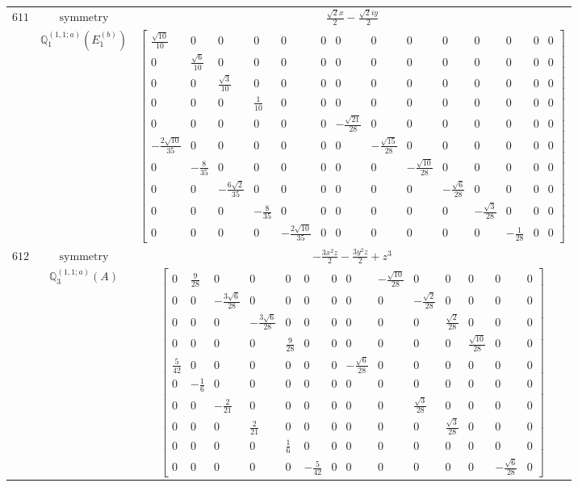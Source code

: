 \documentclass[fleqn,8pt,landscape]{jsarticle}
\begin{document}
\begin{longtable}{ccc}
$ 611 $ & $ \text{symmetry} $ & $ \frac{\sqrt{2} x}{2} - \frac{\sqrt{2} i y}{2} $ \\
$  $ & $ \mathbb{Q}_{1}^{(1,1;a)}(E_{1}^{(b)}) $ & $ \begin{bmatrix} \frac{\sqrt{10}}{10} & 0 & 0 & 0 & 0 & 0 & 0 & 0 & 0 & 0 & 0 & 0 & 0 & 0 \\ 0 & \frac{\sqrt{6}}{10} & 0 & 0 & 0 & 0 & 0 & 0 & 0 & 0 & 0 & 0 & 0 & 0 \\ 0 & 0 & \frac{\sqrt{3}}{10} & 0 & 0 & 0 & 0 & 0 & 0 & 0 & 0 & 0 & 0 & 0 \\ 0 & 0 & 0 & \frac{1}{10} & 0 & 0 & 0 & 0 & 0 & 0 & 0 & 0 & 0 & 0 \\ 0 & 0 & 0 & 0 & 0 & 0 & - \frac{\sqrt{21}}{28} & 0 & 0 & 0 & 0 & 0 & 0 & 0 \\ - \frac{2 \sqrt{10}}{35} & 0 & 0 & 0 & 0 & 0 & 0 & - \frac{\sqrt{15}}{28} & 0 & 0 & 0 & 0 & 0 & 0 \\ 0 & - \frac{8}{35} & 0 & 0 & 0 & 0 & 0 & 0 & - \frac{\sqrt{10}}{28} & 0 & 0 & 0 & 0 & 0 \\ 0 & 0 & - \frac{6 \sqrt{2}}{35} & 0 & 0 & 0 & 0 & 0 & 0 & - \frac{\sqrt{6}}{28} & 0 & 0 & 0 & 0 \\ 0 & 0 & 0 & - \frac{8}{35} & 0 & 0 & 0 & 0 & 0 & 0 & - \frac{\sqrt{3}}{28} & 0 & 0 & 0 \\ 0 & 0 & 0 & 0 & - \frac{2 \sqrt{10}}{35} & 0 & 0 & 0 & 0 & 0 & 0 & - \frac{1}{28} & 0 & 0 \end{bmatrix} $ \\ \hline
$ 612 $ & $ \text{symmetry} $ & $ - \frac{3 x^{2} z}{2} - \frac{3 y^{2} z}{2} + z^{3} $ \\
$  $ & $ \mathbb{Q}_{3}^{(1,1;a)}(A) $ & $ \begin{bmatrix} 0 & \frac{9}{28} & 0 & 0 & 0 & 0 & 0 & 0 & - \frac{\sqrt{10}}{28} & 0 & 0 & 0 & 0 & 0 \\ 0 & 0 & - \frac{3 \sqrt{6}}{28} & 0 & 0 & 0 & 0 & 0 & 0 & - \frac{\sqrt{2}}{28} & 0 & 0 & 0 & 0 \\ 0 & 0 & 0 & - \frac{3 \sqrt{6}}{28} & 0 & 0 & 0 & 0 & 0 & 0 & \frac{\sqrt{2}}{28} & 0 & 0 & 0 \\ 0 & 0 & 0 & 0 & \frac{9}{28} & 0 & 0 & 0 & 0 & 0 & 0 & \frac{\sqrt{10}}{28} & 0 & 0 \\ \frac{5}{42} & 0 & 0 & 0 & 0 & 0 & 0 & - \frac{\sqrt{6}}{28} & 0 & 0 & 0 & 0 & 0 & 0 \\ 0 & - \frac{1}{6} & 0 & 0 & 0 & 0 & 0 & 0 & 0 & 0 & 0 & 0 & 0 & 0 \\ 0 & 0 & - \frac{2}{21} & 0 & 0 & 0 & 0 & 0 & 0 & \frac{\sqrt{3}}{28} & 0 & 0 & 0 & 0 \\ 0 & 0 & 0 & \frac{2}{21} & 0 & 0 & 0 & 0 & 0 & 0 & \frac{\sqrt{3}}{28} & 0 & 0 & 0 \\ 0 & 0 & 0 & 0 & \frac{1}{6} & 0 & 0 & 0 & 0 & 0 & 0 & 0 & 0 & 0 \\ 0 & 0 & 0 & 0 & 0 & - \frac{5}{42} & 0 & 0 & 0 & 0 & 0 & 0 & - \frac{\sqrt{6}}{28} & 0 \end{bmatrix} $ \\ \hline

\end{longtable}
\end{document}
